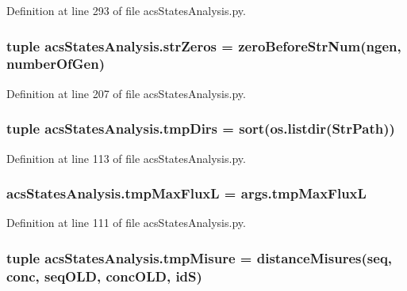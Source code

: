 Definition at line 293 of file acs\-States\-Analysis.\-py.

\hypertarget{a00099_a292c23aa303304f24632662a5dfbfa23}{
\subsubsection[{str\-Zeros}]{\setlength{\rightskip}{0pt plus 5cm}tuple acs\-States\-Analysis.\-str\-Zeros = {\bf zero\-Before\-Str\-Num}(ngen, {\bf number\-Of\-Gen})}}\label{a00099_a292c23aa303304f24632662a5dfbfa23}


Definition at line 207 of file acs\-States\-Analysis.\-py.

\hypertarget{a00099_ab71c19ee20acae0f07934a8d0e9fe50b}{
\subsubsection[{tmp\-Dirs}]{\setlength{\rightskip}{0pt plus 5cm}tuple acs\-States\-Analysis.\-tmp\-Dirs = sort(os.\-listdir({\bf Str\-Path}))}}\label{a00099_ab71c19ee20acae0f07934a8d0e9fe50b}


Definition at line 113 of file acs\-States\-Analysis.\-py.

\hypertarget{a00099_a22a52c6b87e96dc826bc621ee88c380a}{
\subsubsection[{tmp\-Max\-Flux\-L}]{\setlength{\rightskip}{0pt plus 5cm}acs\-States\-Analysis.\-tmp\-Max\-Flux\-L = args.\-tmp\-Max\-Flux\-L}}\label{a00099_a22a52c6b87e96dc826bc621ee88c380a}


Definition at line 111 of file acs\-States\-Analysis.\-py.

\hypertarget{a00099_a45529ce20ca353ca8ac251b4e88c91ff}{
\subsubsection[{tmp\-Misure}]{\setlength{\rightskip}{0pt plus 5cm}tuple acs\-States\-Analysis.\-tmp\-Misure = {\bf distance\-Misures}({\bf seq}, {\bf conc}, {\bf seq\-O\-L\-D}, {\bf conc\-O\-L\-D}, id\-S)}}\label{a00099_a45529ce20ca353ca8ac251b4e88c91ff}


